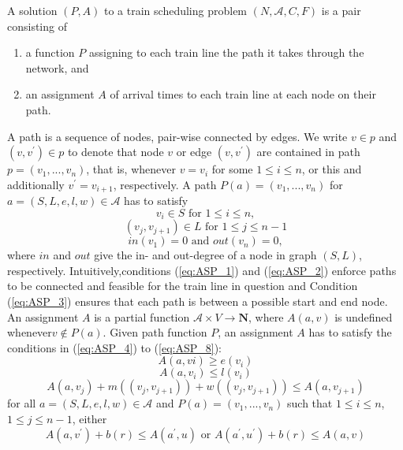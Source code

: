\documentclass{article}
\begin{document}
A solution $(P, A)$ to a train scheduling problem $(N, \mathcal{A}, C, F)$ is a pair consisting of
\begin{enumerate}
    \item a function $P$ assigning to each train line the path it takes through the network, and
    \item an assignment $A$ of arrival times to each train line at each node on their path.
\end{enumerate}
A path is a sequence of nodes, pair-wise connected by edges. We write $v\in p$ and $(v, v^\prime)\in p$ to denote that node $v$ or edge $(v, v^\prime)$ are contained in path $p=(v_1, . . . , v_n)$, that is, whenever $v=v_i$ for some $1\leq i \leq n$, or this and additionally $v^\prime=v_{i+1}$, respectively.
%
A path $P(a) = (v_1, . . . , v_n)$ for $a= (S, L, e, l, w)\in \mathcal{A}$ has to satisfy
\begin{equation}
v_i \in S \textrm{ for }1\leq i \leq n \label{eq:ASP_1},
\end{equation}
\begin{equation}
(v_j, v_{j+1})\in L \textrm{ for } 1\leq j \leq n-1 \label{eq:ASP_2}
\end{equation}
\begin{equation}
in(v_1) = 0 \textrm{ and } out(v_n) = 0,\label{eq:ASP_3}
\end{equation}
where $in$ and $out$ give the in- and out-degree of a node in graph $(S, L)$, respectively.
Intuitively,conditions (\ref{eq:ASP_1}) and (\ref{eq:ASP_2}) enforce paths to be connected and feasible for the train line in question and Condition (\ref{eq:ASP_3}) ensures that each path is between a possible start and end node.
An assignment $A$ is a partial function $\mathcal{A}\times V\to \mathbf{N}$, where $A(a, v)$ is undefined whenever$v\not\in P(a)$. Given path function $P$, an assignment $A$ has to satisfy the conditions in (\ref{eq:ASP_4}) to (\ref{eq:ASP_8}):
\begin{equation}
A(a, vi)\geq e(v_i)\label{eq:ASP_4}
\end{equation}
\begin{equation}
A(a, v_i)\leq l(v_i)\label{eq:ASP_5}
\end{equation}
\begin{equation}
A(a, v_j) +m((v_j, v_{j+1})) +w((v_j, v_{j+1}))\leq A(a, v_{j+1})\label{eq:ASP_6}
\end{equation}
for all $a= (S, L, e, l, w)\in\mathcal{A}$ and $P(a) = (v_1, . . . , v_n)$ such that $1\leq i\leq n$,$1\leq j\leq n-1$,
either
\begin{equation}
A(a, v^\prime) +b(r) \leq A(a^\prime, u) \textrm{ or }A(a^\prime, u^\prime) +b(r)\leq A(a, v) \label{eq:ASP_7}
\end{equation}
\end{document}

